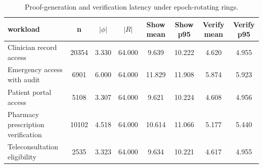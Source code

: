 \begin{table}[htbp]
\centering
\caption{Proof-generation and verification latency under epoch-rotating rings.}
\label{tab:proof-verify}
\begin{tabular}{@{}lccccccc@{}}
\toprule
workload & n & $|\phi|$ & $|R|$ & Show mean & Show p95 & Verify mean & Verify p95 \\
\midrule
Clinician record access & 20354 & 3.330 & 64.000 & 9.639 & 10.222 & 4.620 & 4.955 \\
Emergency access with audit & 6901 & 6.000 & 64.000 & 11.829 & 11.908 & 5.874 & 5.923 \\
Patient portal access & 5108 & 3.307 & 64.000 & 9.621 & 10.224 & 4.608 & 4.956 \\
Pharmacy prescription verification & 10102 & 4.518 & 64.000 & 10.614 & 11.066 & 5.177 & 5.440 \\
Teleconsultation eligibility & 2535 & 3.323 & 64.000 & 9.634 & 10.221 & 4.617 & 4.955 \\
\bottomrule
\end{tabular}
\end{table}
